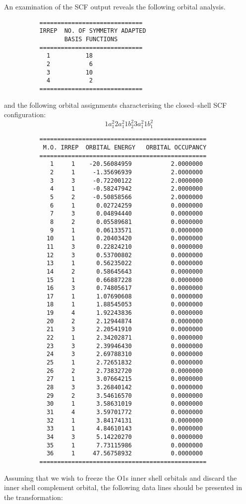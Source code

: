 \documentclass[11pt,fleqn]{article}
\begin{document}
An examination of the SCF output reveals the following orbital analysis.
{
\footnotesize
\begin{verbatim}
          =============================
          IRREP  NO. OF SYMMETRY ADAPTED
                 BASIS FUNCTIONS
          =============================
            1          18
            2           6
            3          10
            4           2
          =============================
\end{verbatim}
}
and the following orbital assignments characterising the closed--shell
SCF configuration:
\begin{equation}
  1a_{1}^{2}  2a_{1}^{2}  1b_{2}^{2}  3a_{1}^{2}  1b_{1}^{2}
\end{equation}
{
\footnotesize
\begin{verbatim}
          ===============================================
           M.O. IRREP  ORBITAL ENERGY   ORBITAL OCCUPANCY
          ===============================================
             1     1    -20.56084959           2.0000000
             2     1     -1.35696939           2.0000000
             3     3     -0.72200122           2.0000000
             4     1     -0.58247942           2.0000000
             5     2     -0.50858566           2.0000000
             6     1      0.02724259           0.0000000
             7     3      0.04894440           0.0000000
             8     2      0.05589681           0.0000000
             9     1      0.06133571           0.0000000
            10     1      0.20403420           0.0000000
            11     3      0.22824210           0.0000000
            12     3      0.53700802           0.0000000
            13     1      0.56235022           0.0000000
            14     2      0.58645643           0.0000000
            15     1      0.66887228           0.0000000
            16     3      0.74805617           0.0000000
            17     1      1.07690608           0.0000000
            18     1      1.88545053           0.0000000
            19     4      1.92243836           0.0000000
            20     2      2.12944874           0.0000000
            21     3      2.20541910           0.0000000
            22     1      2.34202871           0.0000000
            23     3      2.39946430           0.0000000
            24     3      2.69788310           0.0000000
            25     1      2.72651832           0.0000000
            26     2      2.73832720           0.0000000
            27     1      3.07664215           0.0000000
            28     3      3.26840142           0.0000000
            29     2      3.54616570           0.0000000
            30     1      3.58631019           0.0000000
            31     4      3.59701772           0.0000000
            32     1      3.84174131           0.0000000
            33     1      4.84610143           0.0000000
            34     3      5.14220270           0.0000000
            35     1      7.73115986           0.0000000
            36     1     47.56758932           0.0000000
          ===============================================
\end{verbatim}
}
Assuming that we wish to freeze the O1s inner shell orbitals and discard
the inner shell complement orbital, the following data lines
should be presented in the transformation:
\end{document}
